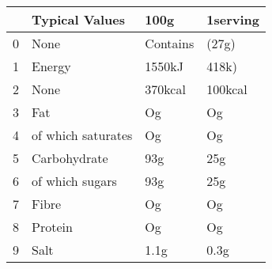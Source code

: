 \begin{tabular}{llll}
\toprule
{} &      Typical Values &      100g & 1serving \\
\midrule
0 &                None &  Contains &    (27g) \\
1 &              Energy &    1550kJ &    418k) \\
2 &                None &   370kcal &  100kcal \\
3 &                 Fat &        Og &       Og \\
4 &  of which saturates &        Og &       Og \\
5 &        Carbohydrate &       93g &      25g \\
6 &     of which sugars &       93g &      25g \\
7 &               Fibre &        Og &       Og \\
8 &             Protein &        Og &       Og \\
9 &                Salt &      1.1g &     0.3g \\
\bottomrule
\end{tabular}
